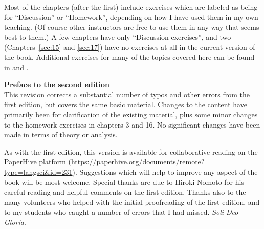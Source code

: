 \begin{refsection}
Most of the chapters (after the first) include exercises which are labeled as being for “Discussion” or “Homework”, depending on how I have used them in my own teaching. (Of course other instructors are free to use them in any way that seems best to them.) A few chapters have only “Discussion exercises”, and two (Chapters~\ref{sec:15} and \ref{sec:17}) have no exercises at all in the current version of the book. Additional exercises for many of the topics covered here can be found in \citet{Saeed2009} and \citet{Kearns2000}.

\bigskip
\noindent \textbf{Preface to the second edition}\\


This revision corrects a substantial number of typos and other errors from the first edition, but covers the same basic material. Changes to the content have primarily been for clarification of the existing material, plus some minor changes to the homework exercises in chapters 3 and 16. No significant changes have been made in terms of theory or analysis.

As with the first edition, this version is available for collaborative reading on the PaperHive platform (\url{https://paperhive.org/documents/remote?type=langsci&id=231}). Suggestions which will help to improve any aspect of the book will be most welcome. Special thanks are due to Hiroki Nomoto for his careful reading and helpful comments on the first edition. Thanks also to the many volunteers who helped with the initial proofreading of the first edition, and to my students who caught a number of errors that I had missed. \textit{Soli Deo Gloria}.

\printbibliography[heading=subbibliography]
\end{refsection}